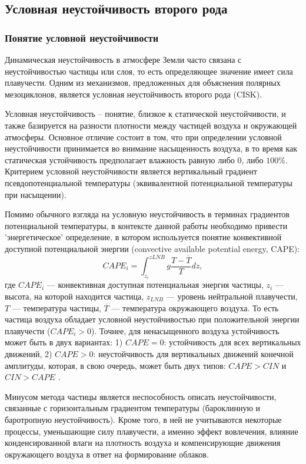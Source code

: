 \label{sec:theory:cisk_wishe}
\subsection{Условная неустойчивость второго рода}
\subsubsection{Понятие условной неустойчивости}
Динамическая неустойчивость в атмосфере Земли часто связана с неустойчивостью частицы или слоя, то есть определяющее значение имеет сила плавучести. Одним из механизмов, предложенных для объяснения полярных мезоциклонов, является условная неустойчивость второго рода (CISK). 

Условная неустойчивость – понятие, близкое к статической неустойчивости, и также базируется на разности плотности между частицей воздуха и окружающей атмосферы. Основное отличие состоит в том, что при определении условной неустойчивости принимается во внимание насыщенность воздуха, в то время как статическая устойчивость предполагает влажность равную либо $0$, либо $100\%$. Критерием условной неустойчивости является вертикальный градиент псевдопотенциальной температуры (эквивалентной потенциальной температуры при насыщении).

Помимо обычного взгляда на условную неустойчивость в терминах градиентов потенциальной температуры, в контексте данной работы необходимо привести 'энергетическое' определение, в котором используется понятие конвективной доступной потенциальной энергии (convective available potential energy, CAPE):
\begin{equation}
CAPE_i = \int_{z_{i}}^{z{LNB}} g\frac{T-\overline{T}}{T}dz,
\end{equation}
где $CAPE_i$ --- конвективная доступная потенциальная энергия частицы, $z_{i}$ --- высота, на которой находится частица, $z_{LNB}$ --- уровень нейтральной плавучести, $T$ --- температура частицы, $\overline{T}$ --- температура окружающего воздуха. То есть частица воздуха обладает условной неустойчивостью при положительной энергии плавучести ($CAPE_i>0$). Точнее, для ненасыщенного воздуха устойчивость может быть в двух вариантах: 1) $CAPE=0$: устойчивость для всех вертикальных движений, 2) $CAPE>0$: неустойчивость для вертикальных движений конечной амплитуды, которая, в свою очередь, может быть двух типов: $CAPE>CIN$ и $CIN>CAPE$ \citep{Lin2007}.

Минусом метода частицы является неспособность описать неустойчивости, связанные с горизонтальным градиентом температуры (бароклинную и баротропную неустойчивость). Кроме того, в ней не учитываются некоторые процессы, уменьшающие силу плавучести, а именно эффект вовлечения, влияние конденсированной влаги на плотность воздуха и компенсирующие движения окружающего воздуха в ответ на формирование облаков.

